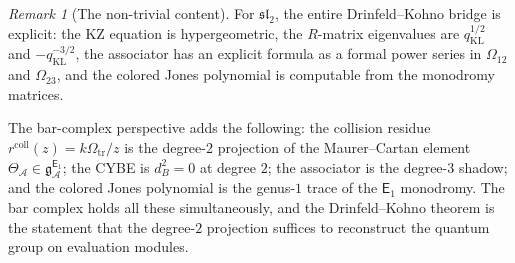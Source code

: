 \documentclass[11pt,reqno]{amsart}
\theoremstyle{definition}
\theoremstyle{remark}
\newtheorem{remark}[theorem]{Remark}
\newcommand{\cA}{\mathcal{A}}
\newcommand{\Eone}{\mathsf{E}_{1}}
\newcommand{\fg}{\mathfrak{g}}
\numberwithin{equation}{section}
\begin{document}
\begin{remark}[The non-trivial content]
For $\mathfrak{sl}_2$, the entire Drinfeld--Kohno bridge is
explicit: the KZ equation is hypergeometric, the $R$-matrix
eigenvalues are \(q_{\mathrm{KL}}^{1/2}\) and
\(-q_{\mathrm{KL}}^{-3/2}\), the associator
has an explicit formula as a formal power series in
$\Omega_{12}$ and $\Omega_{23}$, and the colored Jones
polynomial is computable from the monodromy matrices.

The bar-complex perspective adds the following: the
collision residue $r^{\mathrm{coll}}(z) = k\Omega_{\mathrm{tr}}/z$ is the degree-$2$
projection of the Maurer--Cartan element
$\Theta_\cA \in \fg^{\Eone}_\cA$; the CYBE is $d_B^2 = 0$
at degree $2$; the associator is the degree-$3$ shadow; and
the colored Jones polynomial is the genus-$1$ trace of the
$\Eone$ monodromy.  The bar complex holds all these
simultaneously, and the Drinfeld--Kohno theorem is the
statement that the degree-$2$ projection suffices to
reconstruct the quantum group on evaluation modules.
\end{remark}
\end{document}
